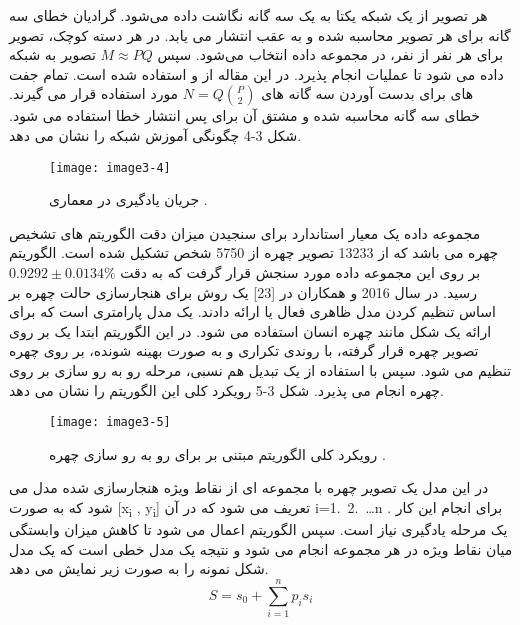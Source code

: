 \noindent
هر تصویر از یک شبکه یکتا به یک سه گانه نگاشت داده می‌شود. گرادیان خطای سه گانه برای هر تصویر محاسبه شده و به عقب انتشار می یابد. در هر دسته کوچک،  تصویر برای هر نفر از  نفر، در مجموعه داده انتخاب می‌شود. سپس
$M \approx PQ$
تصویر به شبکه داده می شود تا عملیات  انجام پذیرد. در این مقاله از
و
استفاده شده است. تمام جفت های  برای بدست آوردن سه گانه های
$N = Q \binom{P}{2}$
مورد استفاده قرار می گیرند. خطای سه گانه محاسبه شده و مشتق آن برای پس انتشار خطا استفاده می شود. شکل 3-4 چگونگی آموزش شبکه را نشان می دهد.
 \begin{figure}[h]
\centering
  \texttt{[image: image3-4]}
  \caption{جریان یادگیری در معماری  \cite{ref1}.}
  \label{image2-1}
\end{figure}
\noindent
مجموعه داده  یک معیار استاندارد برای سنجیدن میزان دقت الگوریتم های تشخیص چهره می باشد که از 13233 تصویر چهره از 5750 شخص تشکیل شده است. الگوریتم  بر روی این مجموعه داده مورد سنجش قرار گرفت که به دقت
 $0.9292\pm0.0134 \%$ 
رسید.
\noindent
در سال 2016  و همکاران در [23] یک روش برای هنجارسازی حالت چهره بر اساس تنظیم کردن مدل  ظاهری فعال  یا  ارائه دادند.  یک مدل پارامتری است که برای ارائه یک شکل مانند چهره انسان استفاده می شود. در این الگوریتم ابتدا یک  بر روی تصویر چهره قرار گرفته، با روندی تکراری و به صورت بهینه شونده، بر روی چهره تنظیم می شود. سپس با استفاده از یک تبدیل هم نسبی، مرحله رو به رو سازی بر روی چهره انجام می پذیرد. شکل 3-5 رویکرد کلی این الگوریتم را نشان می دهد. 
 \begin{figure}[h]
\centering
  \texttt{[image: image3-5]}
  \caption{رویکرد کلی الگوریتم مبتنی بر  برای رو به رو سازی چهره \cite{ref1}.}
  \label{image2-1}
\end{figure}
\noindent
در این مدل یک تصویر چهره با مجموعه ای از نقاط ویژه هنجارسازی شده مدل می شود که به صورت
[x\textsubscript{i} , y\textsubscript{i}]
تعریف می شود که در آن
i=1.\ 2.\ \ldots n .
برای انجام این کار یک مرحله یادگیری نیاز است. سپس الگوریتم  اعمال می شود تا کاهش میزان وابستگی میان نقاط ویژه در هر مجموعه انجام می شود و نتیجه یک مدل خطی است که یک مدل شکل نمونه را به صورت زیر نمایش می دهد.
\begin{equation}\label{eq3-1}
S=s_0+\sum_{i=1}^{n}{p_is_i}
\end{equation}
	
